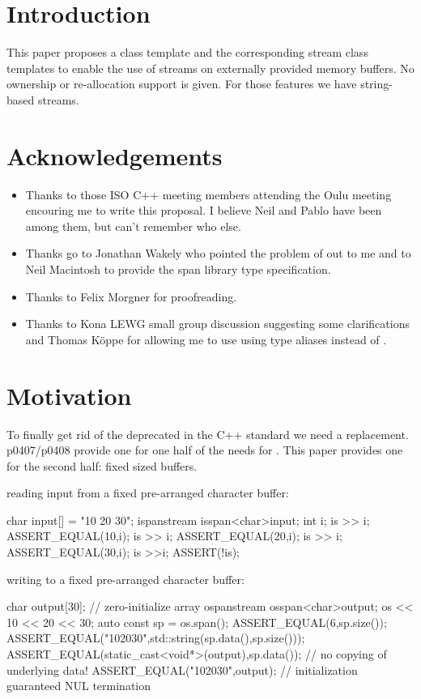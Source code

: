 \documentclass[ebook,11pt,article]{memoir}
\begin{document}
\chapter{Introduction}
This paper proposes a class template  and the corresponding stream class templates to enable the use of streams on externally provided memory buffers. No ownership or re-allocation support is given. For those features we have string-based streams.

\chapter{Acknowledgements}
\begin{itemize}
\item Thanks to those ISO C++ meeting members attending the Oulu meeting encouring me to write this proposal. I believe Neil and Pablo have been among them, but can't remember who else.
\item Thanks go to Jonathan Wakely who pointed the problem of  out to me and to Neil Macintosh to provide the span library type specification.
\item Thanks to Felix Morgner for proofreading.
\item Thanks to Kona LEWG small group discussion suggesting some clarifications and Thomas K\"oppe for allowing me to use using type aliases instead of .
\end{itemize}

\chapter{Motivation}
To finally get rid of the deprecated  in the C++ standard we need a replacement. p0407/p0408 provide one for one half of the needs for . This paper provides one for the second half: fixed sized buffers. 

\begin{example} reading input from a fixed pre-arranged character buffer:
\begin{codeblock}
char input[] = "10 20 30";
ispanstream is{span<char>{input}};
int i;
is >> i;
ASSERT_EQUAL(10,i);
is >> i;
ASSERT_EQUAL(20,i);
is >> i;
ASSERT_EQUAL(30,i);
is >>i;
ASSERT(!is);
\end{codeblock}
\end{example}
\begin{example} writing to a fixed pre-arranged character buffer:
\begin{codeblock}
char  output[30]{}; // zero-initialize array
ospanstream os{span<char>{output}};
os << 10 << 20 << 30;
auto const sp = os.span();
ASSERT_EQUAL(6,sp.size());
ASSERT_EQUAL("102030",std::string(sp.data(),sp.size()));
ASSERT_EQUAL(static_cast<void*>(output),sp.data()); // no copying of underlying data!
ASSERT_EQUAL("102030",output); // initialization guaranteed NUL termination
\end{codeblock}
\end{example}
\end{document}
